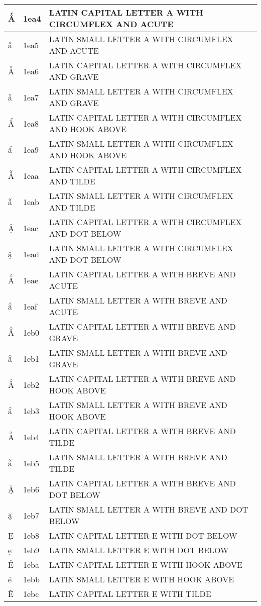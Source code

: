 \documentclass[12pt,letterpaper,openany]{book}
\begin{document}
\begin{center}
\begin{supertabular}{|m{0.25in}|m{0.5in}|m{4in}|}
Ấ & 1ea4 & LATIN CAPITAL LETTER A WITH CIRCUMFLEX AND ACUTE\\\hline
ấ & 1ea5 & LATIN SMALL LETTER A WITH CIRCUMFLEX AND ACUTE\\\hline
Ầ & 1ea6 & LATIN CAPITAL LETTER A WITH CIRCUMFLEX AND GRAVE\\\hline
ầ & 1ea7 & LATIN SMALL LETTER A WITH CIRCUMFLEX AND GRAVE\\\hline
Ẩ & 1ea8 & LATIN CAPITAL LETTER A WITH CIRCUMFLEX AND HOOK ABOVE\\\hline
ẩ & 1ea9 & LATIN SMALL LETTER A WITH CIRCUMFLEX AND HOOK ABOVE\\\hline
Ẫ & 1eaa & LATIN CAPITAL LETTER A WITH CIRCUMFLEX AND TILDE\\\hline
ẫ & 1eab & LATIN SMALL LETTER A WITH CIRCUMFLEX AND TILDE\\\hline
Ậ & 1eac & LATIN CAPITAL LETTER A WITH CIRCUMFLEX AND DOT BELOW\\\hline
ậ & 1ead & LATIN SMALL LETTER A WITH CIRCUMFLEX AND DOT BELOW\\\hline
Ắ & 1eae & LATIN CAPITAL LETTER A WITH BREVE AND ACUTE\\\hline
ắ & 1eaf & LATIN SMALL LETTER A WITH BREVE AND ACUTE\\\hline
Ằ & 1eb0 & LATIN CAPITAL LETTER A WITH BREVE AND GRAVE\\\hline
ằ & 1eb1 & LATIN SMALL LETTER A WITH BREVE AND GRAVE\\\hline
Ẳ & 1eb2 & LATIN CAPITAL LETTER A WITH BREVE AND HOOK ABOVE\\\hline
ẳ & 1eb3 & LATIN SMALL LETTER A WITH BREVE AND HOOK ABOVE\\\hline
Ẵ & 1eb4 & LATIN CAPITAL LETTER A WITH BREVE AND TILDE\\\hline
ẵ & 1eb5 & LATIN SMALL LETTER A WITH BREVE AND TILDE\\\hline
Ặ & 1eb6 & LATIN CAPITAL LETTER A WITH BREVE AND DOT BELOW\\\hline
ặ & 1eb7 & LATIN SMALL LETTER A WITH BREVE AND DOT BELOW\\\hline
Ẹ & 1eb8 & LATIN CAPITAL LETTER E WITH DOT BELOW\\\hline
ẹ & 1eb9 & LATIN SMALL LETTER E WITH DOT BELOW\\\hline
Ẻ & 1eba & LATIN CAPITAL LETTER E WITH HOOK ABOVE\\\hline
ẻ & 1ebb & LATIN SMALL LETTER E WITH HOOK ABOVE\\\hline
Ẽ & 1ebc & LATIN CAPITAL LETTER E WITH TILDE\\\hline

\end{supertabular}
\end{center}
\end{document}
